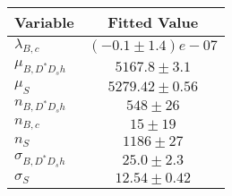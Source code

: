 \begin{tabular}[t]{lc}
\hline
Variable &Fitted Value\\
\hline\hline
$\lambda_{B,c}$&$(-0.1\pm1.4)e-07$\\
\hline
$\mu_{B, D^* D_s h}$&$5167.8\pm3.1$\\
\hline
$\mu_S$&$5279.42\pm0.56$\\
\hline
$n_{B, D^* D_s h}$&$548\pm26$\\
\hline
$n_{B,c}$&$15\pm19$\\
\hline
$n_S$&$1186\pm27$\\
\hline
$\sigma_{B, D^* D_s h}$&$25.0\pm2.3$\\
\hline
$\sigma_S$&$12.54\pm0.42$\\
\hline
\end{tabular}